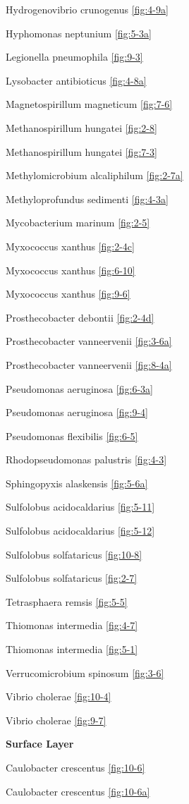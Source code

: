 \documentclass[]{tufte-book}
\begin{document}
Hydrogenovibrio crunogenus \ref{fig:4-9a}

Hyphomonas neptunium \ref{fig:5-3a}

Legionella pneumophila \ref{fig:9-3}

Lysobacter antibioticus \ref{fig:4-8a}

Magnetospirillum magneticum \ref{fig:7-6}

Methanospirillum hungatei \ref{fig:2-8}

Methanospirillum hungatei \ref{fig:7-3}

Methylomicrobium alcaliphilum \ref{fig:2-7a}

Methyloprofundus sedimenti \ref{fig:4-3a}

Mycobacterium marinum \ref{fig:2-5}

Myxococcus xanthus \ref{fig:2-4c}

Myxococcus xanthus \ref{fig:6-10}

Myxococcus xanthus \ref{fig:9-6}

Prosthecobacter debontii \ref{fig:2-4d}

Prosthecobacter vanneervenii \ref{fig:3-6a}

Prosthecobacter vanneervenii \ref{fig:8-4a}

Pseudomonas aeruginosa \ref{fig:6-3a}

Pseudomonas aeruginosa \ref{fig:9-4}

Pseudomonas flexibilis \ref{fig:6-5}

Rhodopseudomonas palustris \ref{fig:4-3}

Sphingopyxis alaskensis \ref{fig:5-6a}

Sulfolobus acidocaldarius \ref{fig:5-11}

Sulfolobus acidocaldarius \ref{fig:5-12}

Sulfolobus solfataricus \ref{fig:10-8}

Sulfolobus solfataricus \ref{fig:2-7}

Tetrasphaera remsis \ref{fig:5-5}

Thiomonas intermedia \ref{fig:4-7}

Thiomonas intermedia \ref{fig:5-1}

Verrucomicrobium spinosum \ref{fig:3-6}

Vibrio cholerae \ref{fig:10-4}

Vibrio cholerae \ref{fig:9-7}

\textbf{Surface Layer}

Caulobacter crescentus \ref{fig:10-6}

Caulobacter crescentus \ref{fig:10-6a}
\end{document}
